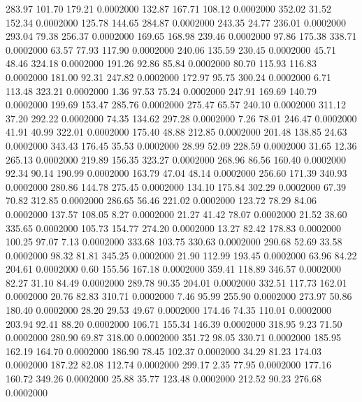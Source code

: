 283.97  101.70  179.21   0.0002000
 132.87  167.71  108.12   0.0002000
 352.02   31.52  152.34   0.0002000
 125.78  144.65  284.87   0.0002000
 243.35   24.77  236.01   0.0002000
 293.04   79.38  256.37   0.0002000
 169.65  168.98  239.46   0.0002000
  97.86  175.38  338.71   0.0002000
  63.57   77.93  117.90   0.0002000
 240.06  135.59  230.45   0.0002000
  45.71   48.46  324.18   0.0002000
 191.26   92.86   85.84   0.0002000
  80.70  115.93  116.83   0.0002000
 181.00   92.31  247.82   0.0002000
 172.97   95.75  300.24   0.0002000
   6.71  113.48  323.21   0.0002000
   1.36   97.53   75.24   0.0002000
 247.91  169.69  140.79   0.0002000
 199.69  153.47  285.76   0.0002000
 275.47   65.57  240.10   0.0002000
 311.12   37.20  292.22   0.0002000
  74.35  134.62  297.28   0.0002000
   7.26   78.01  246.47   0.0002000
  41.91   40.99  322.01   0.0002000
 175.40   48.88  212.85   0.0002000
 201.48  138.85   24.63   0.0002000
 343.43  176.45   35.53   0.0002000
  28.99   52.09  228.59   0.0002000
  31.65   12.36  265.13   0.0002000
 219.89  156.35  323.27   0.0002000
 268.96   86.56  160.40   0.0002000
  92.34   90.14  190.99   0.0002000
 163.79   47.04   48.14   0.0002000
 256.60  171.39  340.93   0.0002000
 280.86  144.78  275.45   0.0002000
 134.10  175.84  302.29   0.0002000
  67.39   70.82  312.85   0.0002000
 286.65   56.46  221.02   0.0002000
 123.72   78.29   84.06   0.0002000
 137.57  108.05    8.27   0.0002000
  21.27   41.42   78.07   0.0002000
  21.52   38.60  335.65   0.0002000
 105.73  154.77  274.20   0.0002000
  13.27   82.42  178.83   0.0002000
 100.25   97.07    7.13   0.0002000
 333.68  103.75  330.63   0.0002000
 290.68   52.69   33.58   0.0002000
  98.32   81.81  345.25   0.0002000
  21.90  112.99  193.45   0.0002000
  63.96   84.22  204.61   0.0002000
   0.60  155.56  167.18   0.0002000
 359.41  118.89  346.57   0.0002000
  82.27   31.10   84.49   0.0002000
 289.78   90.35  204.01   0.0002000
 332.51  117.73  162.01   0.0002000
  20.76   82.83  310.71   0.0002000
   7.46   95.99  255.90   0.0002000
 273.97   50.86  180.40   0.0002000
  28.20   29.53   49.67   0.0002000
 174.46   74.35  110.01   0.0002000
 203.94   92.41   88.20   0.0002000
 106.71  155.34  146.39   0.0002000
 318.95    9.23   71.50   0.0002000
 280.90   69.87  318.00   0.0002000
 351.72   98.05  330.71   0.0002000
 185.95  162.19  164.70   0.0002000
 186.90   78.45  102.37   0.0002000
  34.29   81.23  174.03   0.0002000
 187.22   82.08  112.74   0.0002000
 299.17    2.35   77.95   0.0002000
 177.16  160.72  349.26   0.0002000
  25.88   35.77  123.48   0.0002000
 212.52   90.23  276.68   0.0002000
